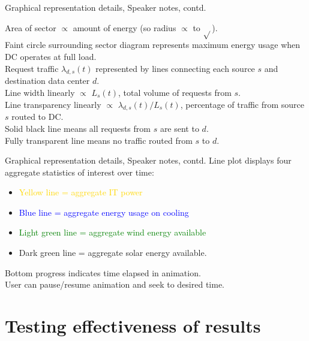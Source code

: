 \documentclass[xcolor=dvipsnames]{beamer}
\begin{document}
\begin{frame}{Graphical representation details, Speaker notes, contd.}

	Area of sector $\propto$ amount of energy (so radius $\propto$ to $\sqrt{}$). \\ 
	Faint circle surrounding sector diagram represents maximum energy usage when DC operates at full load. \\
	Request traffic $\lambda_{d,s}(t)$ represented by lines connecting each source $s$ and destination data center $d$. \\
	Line width linearly $\propto$ $L_s(t)$, total volume of requests from $s$. \\
	Line transparency linearly $\propto$ ${\lambda_{d,s}(t)} / {L_s(t)}$, percentage of traffic from source $s$ routed to DC.  \\
	Solid black line means all requests from $s$ are sent to $d$. \\
	Fully transparent line means no traffic routed from $s$ to $d$.
\end{frame}

\begin{frame}{Graphical representation details, Speaker notes, contd.}
	Line plot displays four aggregate statistics of interest over time: 
	\begin{itemize}
	\item{\textcolor{gold}{Yellow line = aggregate IT power}}
	\item{\textcolor{blue}{Blue line = aggregate energy usage on cooling}}
	\item{\textcolor{green}{Light green line = aggregate wind energy available}}
	\item{\textcolor{dgreen}{Dark green line = aggregate solar energy available}.}
	\end{itemize}
	Bottom progress indicates time elapsed in animation. \\
	User can pause/resume animation and seek to desired time.
\end{frame}


\section{Testing effectiveness of results}
\end{document}
